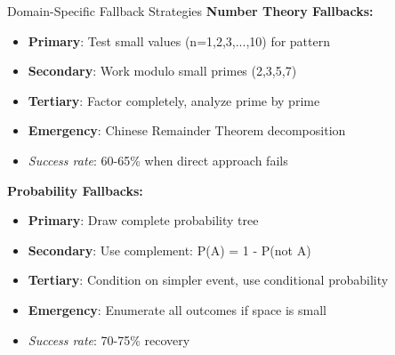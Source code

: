 \documentclass{article}
\begin{document}
\begin{classifybox}{Domain-Specific Fallback Strategies}
\textbf{Number Theory Fallbacks:}
\begin{itemize}[nosep]
\item \textbf{Primary}: Test small values (n=1,2,3,...,10) for pattern
\item \textbf{Secondary}: Work modulo small primes (2,3,5,7)
\item \textbf{Tertiary}: Factor completely, analyze prime by prime
\item \textbf{Emergency}: Chinese Remainder Theorem decomposition
\item \textit{Success rate}: 60-65\% when direct approach fails
\end{itemize}

\textbf{Probability Fallbacks:}
\begin{itemize}[nosep]
\item \textbf{Primary}: Draw complete probability tree
\item \textbf{Secondary}: Use complement: P(A) = 1 - P(not A)
\item \textbf{Tertiary}: Condition on simpler event, use conditional probability
\item \textbf{Emergency}: Enumerate all outcomes if space is small
\item \textit{Success rate}: 70-75\% recovery
\end{itemize}
\end{classifybox}
\end{document}
